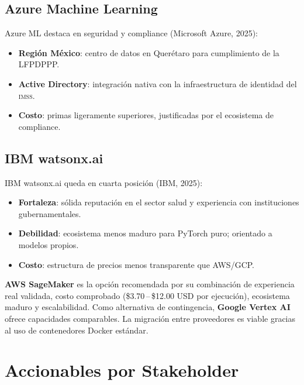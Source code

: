 \documentclass[12pt, letterpaper]{article}
\newcommand{\imss}{\textnormal{\textsc{imss}}}
\begin{document}
\subsection{Azure Machine Learning}

Azure ML destaca en seguridad y compliance (Microsoft Azure, 2025):

\begin{itemize}[noitemsep]
    \item \textbf{Región México}: centro de datos en Querétaro para cumplimiento de la LFPDPPP.
    \item \textbf{Active Directory}: integración nativa con la infraestructura de identidad del {\imss}.
    \item \textbf{Costo}: primas ligeramente superiores, justificadas por el ecosistema de compliance.
\end{itemize}

\subsection{IBM watsonx.ai}

IBM watsonx.ai queda en cuarta posición (IBM, 2025):

\begin{itemize}[noitemsep]
    \item \textbf{Fortaleza}: sólida reputación en el sector salud y experiencia con instituciones gubernamentales.
    \item \textbf{Debilidad}: ecosistema menos maduro para PyTorch puro; orientado a modelos propios.
    \item \textbf{Costo}: estructura de precios menos transparente que AWS/GCP.
\end{itemize}

\begin{insightbox}
\textbf{AWS SageMaker} es la opción recomendada por su combinación de experiencia real validada, costo comprobado (\$3.70\,--\,\$12.00 USD por ejecución), ecosistema maduro y escalabilidad. Como alternativa de contingencia, \textbf{Google Vertex AI} ofrece capacidades comparables. La migración entre proveedores es viable gracias al uso de contenedores Docker estándar.
\end{insightbox}

\newpage
\section{Accionables por Stakeholder}\label{sec:accionables}
\end{document}
